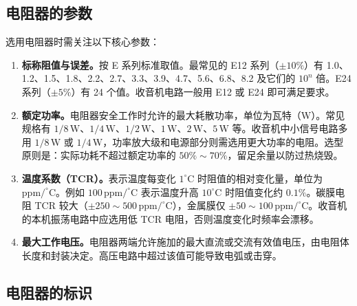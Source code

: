 \documentclass[12pt,UTF8]{ctexbook}
\begin{document}
\subsection{电阻器的参数}

选用电阻器时需关注以下核心参数：

\begin{enumerate}
\item \textbf{标称阻值与误差。}按 E 系列标准取值。最常见的 E12 系列（$\pm10\%$）有 1.0、1.2、1.5、1.8、2.2、2.7、3.3、3.9、4.7、5.6、6.8、8.2 及它们的 $10^n$ 倍。E24 系列（$\pm5\%$）有 24 个值。收音机电路一般用 E12 或 E24 即可满足要求。

\item \textbf{额定功率。}电阻器安全工作时允许的最大耗散功率，单位为瓦特（W）。常见规格有 $1/8\,\mathrm{W}$、$1/4\,\mathrm{W}$、$1/2\,\mathrm{W}$、$1\,\mathrm{W}$、$2\,\mathrm{W}$、$5\,\mathrm{W}$ 等。收音机中小信号电路多用 $1/8\,\mathrm{W}$ 或 $1/4\,\mathrm{W}$，功率放大级和电源部分则需选用更大功率的电阻。选型原则是：实际功耗不超过额定功率的 $50\%\sim70\%$，留足余量以防过热烧毁。

\item \textbf{温度系数（TCR）。}表示温度每变化 $1^\circ\mathrm{C}$ 时阻值的相对变化量，单位为 $\mathrm{ppm/^\circ C}$。例如 $100\,\mathrm{ppm/^\circ C}$ 表示温度升高 $10^\circ\mathrm{C}$ 时阻值变化约 $0.1\%$。碳膜电阻 TCR 较大（$\pm 250\sim500\,\mathrm{ppm/^\circ C}$），金属膜仅 $\pm 50\sim100\,\mathrm{ppm/^\circ C}$。收音机的本机振荡电路中应选用低 TCR 电阻，否则温度变化时频率会漂移。

\item \textbf{最大工作电压。}电阻器两端允许施加的最大直流或交流有效值电压，由电阻体长度和封装决定。高压电路中超过该值可能导致电弧或击穿。
\end{enumerate}

\subsection{电阻器的标识}
\end{document}

